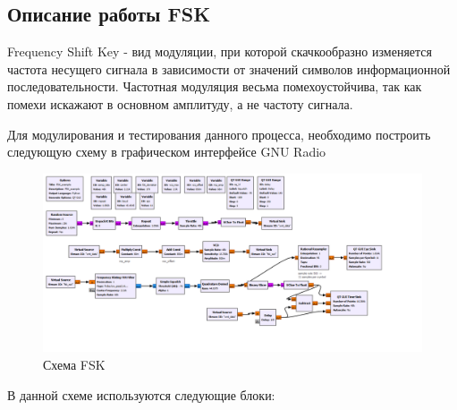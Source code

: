 \subsection{Описание работы FSK}

Frequency Shift Key - вид модуляции, при которой скачкообразно изменяется частота несущего сигнала в зависимости от значений символов информационной последовательности. Частотная модуляция весьма помехоустойчива, так как помехи искажают в основном амплитуду, а не частоту сигнала.

Для модулирования и тестирования данного процесса, необходимо построить следующую схему в графическом интерфейсе GNU Radio
    
    \begin{landscape}
	\begin{figure}[H]
		\centering
		\includegraphics[width=25.5cm]{fig/lab12/lab12_1.png}
		\caption{Схема FSK}
		\label{pic:fsk_scheme} %
	\end{figure}
\end{landscape}

В данной схеме используются следующие блоки:

